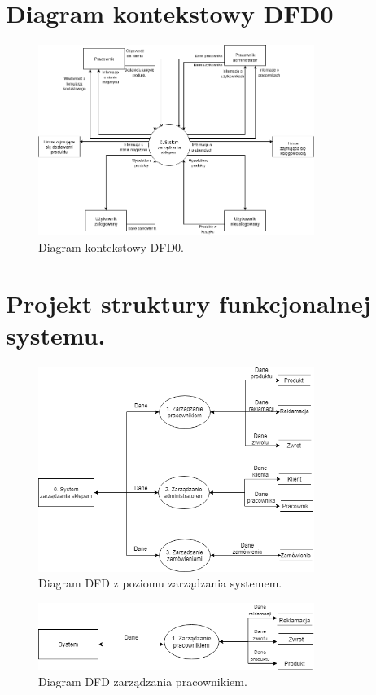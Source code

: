 \documentclass[a4paper,11pt]{article}
\begin{document}
\section {Diagram kontekstowy DFD0}

\begin{figure}[H]
	\centering
		\includegraphics[width=0.8\textwidth]{Diagramy/DFD0.png}
	\caption{Diagram kontekstowy DFD0.}
\end{figure}

\section {Projekt struktury funkcjonalnej systemu.}

\begin{figure}[H]
	\centering
		\includegraphics[width=0.8\textwidth]{Diagramy/DFD-Ogolny.png}
	\caption{Diagram DFD z poziomu zarządzania systemem.}
\end{figure}

\begin{figure}[H]
	\centering
		\includegraphics[width=0.8\textwidth]{Diagramy/DFD0-DFD1.png}
	\caption{Diagram DFD zarządzania pracownikiem.}
\end{figure}
\end{document}
